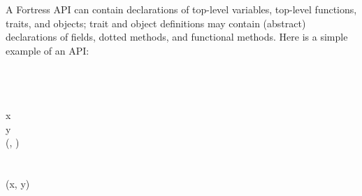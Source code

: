 A Fortress API can contain declarations of top-level variables,
top-level functions, traits, and objects; trait and object
definitions may contain (abstract) declarations of fields,
dotted methods, and functional methods.  Here is a simple example
of an API:
\begin{codeexamplesize}
\begin{FortressCode}
  \\
 \\
  \\
\2\+x\COLON {} \\
  y\COLON {} \\
  (, \COLON {})\COLON {}\- \\
 \\
 \\
(x\COLON {}, y\COLON {})\COLON {} \\
 \\
 
\end{FortressCode}
\end{codeexamplesize}

